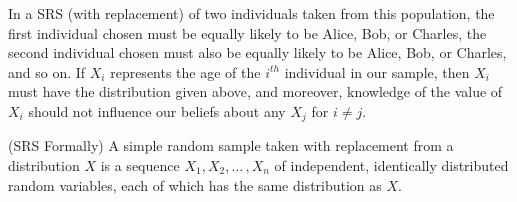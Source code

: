 \begin{center}
    \begin{minipage}{.45\textwidth}
       \centering
      \renewcommand*{\arraystretch}{1.35}
\renewcommand*{\arraystretch}{1}
\vspace{1em}
    \end{minipage}%
    \begin{minipage}{0.5\textwidth}
        \centering
{}
\end{minipage}
\end{center}

\par
In a SRS (with replacement) of two individuals taken from this population, the first individual chosen must be equally likely to be Alice, Bob, or Charles, the second individual chosen must also be equally likely to be Alice, Bob, or Charles, and so on. If $X_i$ represents the age of the $i^{th}$ individual in our sample, then $X_i$ must have the distribution given above, and moreover, knowledge of the value of $X_i$ should not influence our beliefs about any $X_j$ for $i \neq j$.
\par
\begin{defn}\label{FormalSRSDef} (SRS Formally) A simple random sample taken with replacement from a distribution $X$ is a sequence $X_1, X_2, \dots \,, X_n$ of independent, identically distributed random variables, each of which has the same distribution as $X$.
\end{defn}

